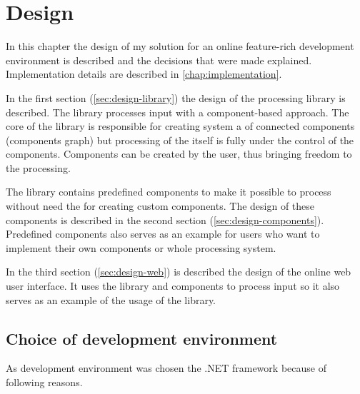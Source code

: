 
\chapter{Design}

In this chapter the design of my solution for an online feature-rich development environment is described and the decisions that were made explained.
Implementation details are described in \autoref{chap:implementation}.

In the first section (\ref{sec:design-library}) the design of the \lsystem processing library is described.
The library processes input with a component-based approach.
The core of the library is responsible for creating system a of connected components (components graph) but processing of the \lsystem itself is fully under the control of the components.
Components can be created by the user, thus bringing freedom to the \lsystem processing.

The library contains predefined components to make it possible to process \lsystems without need the for creating custom components.
The design of these components is described in the second section (\ref{sec:design-components}).
Predefined components also serves as an example for users who want to implement their own components or whole processing system.

In the third section (\ref{sec:design-web}) is described the design of the online web user interface.
It uses the library and components to process input so it also serves as an example of the usage of the library.


\section{Choice of development environment}

As development environment was chosen the .NET framework because of following reasons.

